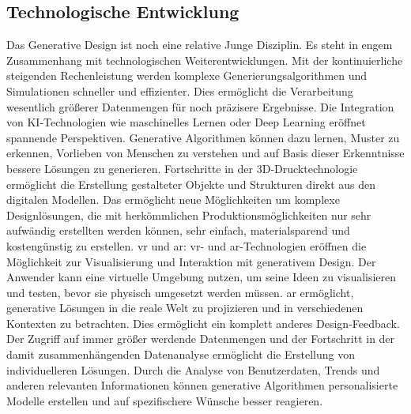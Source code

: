\subsection*{Technologische Entwicklung}
Das Generative Design ist noch eine relative Junge Disziplin. Es steht in engem Zusammenhang mit technologischen Weiterentwicklungen. 
Mit der kontinuierliche steigenden Rechenleistung werden komplexe Generierungsalgorithmen und Simulationen schneller und effizienter. Dies ermöglicht die Verarbeitung wesentlich größerer Datenmengen für noch präzisere Ergebnisse.
Die Integration von KI-Technologien wie maschinelles Lernen oder Deep Learning eröffnet spannende Perspektiven. Generative Algorithmen können dazu lernen, Muster zu erkennen, Vorlieben von Menschen zu verstehen und auf Basis dieser Erkenntnisse bessere Lösungen zu generieren. 
Fortschritte in der 3D-Drucktechnologie ermöglicht die Erstellung gestalteter Objekte und Strukturen direkt aus den digitalen Modellen. Das ermöglicht neue Möglichkeiten um komplexe Designlösungen, die mit herkömmlichen Produktionsmöglichkeiten nur sehr aufwändig erstellten werden können, sehr einfach, materialsparend und kostengünstig zu erstellen. 
\ac*{vr} und \ac*{ar}: \ac*{vr}- und \ac*{ar}-Technologien eröffnen die Möglichkeit zur Visualisierung und Interaktion mit generativem Design. Der Anwender kann eine virtuelle Umgebung nutzen, um seine Ideen zu visualisieren und testen, bevor sie physisch umgesetzt werden müssen. \ac*{ar} ermöglicht, generative Lösungen in die reale Welt zu projizieren und in verschiedenen Kontexten zu betrachten. Dies ermöglicht ein komplett anderes Design-Feedback. 
Der Zugriff auf immer größer werdende Datenmengen und der Fortschritt in der damit zusammenhängenden Datenanalyse ermöglicht die Erstellung von individuelleren Lösungen. Durch die Analyse von Benutzerdaten, Trends und anderen relevanten Informationen können  generative Algorithmen personalisierte Modelle erstellen und auf spezifischere Wünsche besser reagieren. \autocite*{10}
